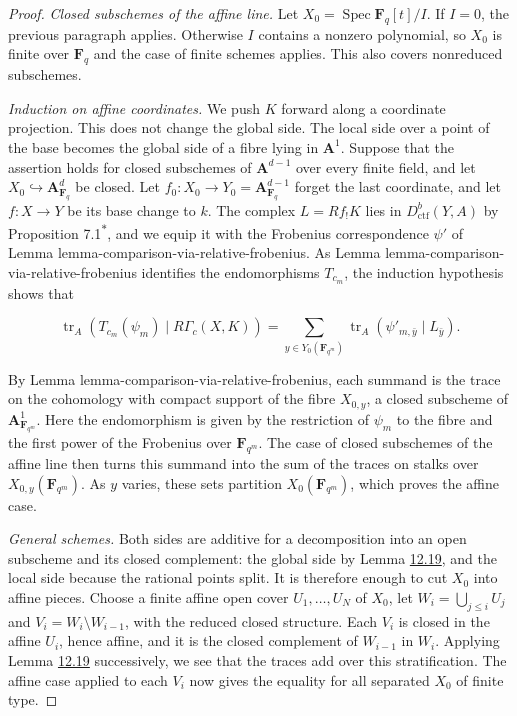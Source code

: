\documentclass[11pt]{article}
\newcommand{\bpout}[1]{#1\textsuperscript{\hyperlink{bp-outside}{\ensuremath{\ast}}}}
\begin{document}
\begin{proof}[{Proof}]
\emph{Closed subschemes of the affine line.} Let \(X_0=\operatorname{Spec}\mathbf F_q[t]/I\). If \(I=0\), the previous paragraph applies. Otherwise \(I\) contains a nonzero polynomial, so \(X_0\) is finite over \(\mathbf F_q\) and the case of finite schemes applies. This also covers nonreduced subschemes.

\emph{Induction on affine coordinates.} We push \(K\) forward along a coordinate projection. This does not change the global side. The local side over a point of the base becomes the global side of a fibre lying in \(\mathbf A^1\). Suppose that the assertion holds for closed subschemes of \(\mathbf A^{d-1}\) over every finite field, and let \(X_0\hookrightarrow\mathbf A^d_{\mathbf F_q}\) be closed. Let \(f_0:X_0\to Y_0=\mathbf A^{d-1}_{\mathbf F_q}\) forget the last coordinate, and let \(f:X\to Y\) be its base change to \(k\). The complex \(L=Rf_!K\) lies in \(D^b_{\mathrm{ctf}}(Y,A)\) by Proposition \bpout{7.1}, and we equip it with the Frobenius correspondence \(\psi'\) of Lemma lemma-comparison-via-relative-frobenius. As Lemma lemma-comparison-via-relative-frobenius identifies the endomorphisms \(T_{c_m}\), the induction hypothesis shows that

\[
\operatorname{tr}_A(T_{c_m}(\psi_m)\mid R\Gamma_c(X,K))
=\sum_{y\in Y_0(\mathbf F_{q^m})}
\operatorname{tr}_A(\psi'_{m,\bar y}\mid L_{\bar y}).
\]

By Lemma lemma-comparison-via-relative-frobenius, each summand is the trace on the cohomology with compact support of the fibre \(X_{0,y}\), a closed subscheme of \(\mathbf A^1_{\mathbf F_{q^m}}\). Here the endomorphism is given by the restriction of \(\psi_m\) to the fibre and the first power of the Frobenius over \(\mathbf F_{q^m}\). The case of closed subschemes of the affine line then turns this summand into the sum of the traces on stalks over \(X_{0,y}(\mathbf F_{q^m})\). As \(y\) varies, these sets partition \(X_0(\mathbf F_{q^m})\), which proves the affine case.

\emph{General schemes.} Both sides are additive for a decomposition into an open subscheme and its closed complement: the global side by Lemma \hyperref[bp58]{12.19}, and the local side because the rational points split. It is therefore enough to cut \(X_0\) into affine pieces. Choose a finite affine open cover \(U_1,\ldots,U_N\) of \(X_0\), let \(W_i=\bigcup_{j\leq i}U_j\) and \(V_i=W_i\setminus W_{i-1}\), with the reduced closed structure. Each \(V_i\) is closed in the affine \(U_i\), hence affine, and it is the closed complement of \(W_{i-1}\) in \(W_i\). Applying Lemma \hyperref[bp58]{12.19} successively, we see that the traces add over this stratification. The affine case applied to each \(V_i\) now gives the equality for all separated \(X_0\) of finite type.
\end{proof}
\end{document}
